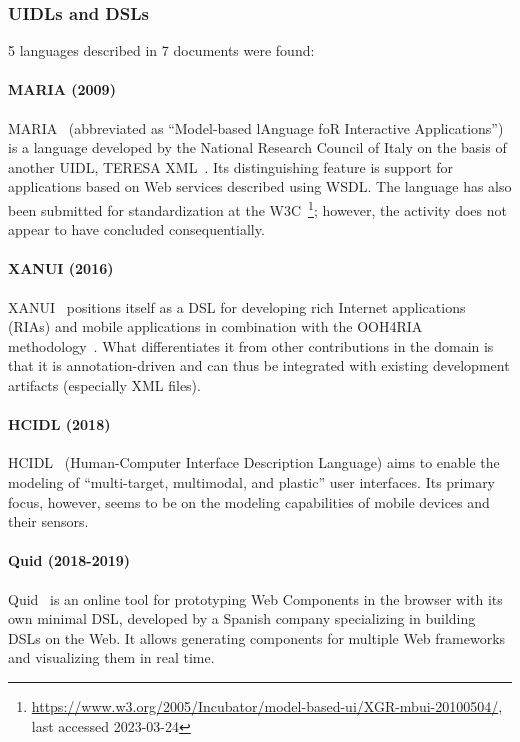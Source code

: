 \subsubsection{UIDLs and DSLs}
5 languages described in 7 documents were found:

\paragraph{MARIA (2009)}
MARIA~\cite{Paterno2009, MariaPDF} (abbreviated as \enquote{Model-based lAnguage foR Interactive Applications}) is a language developed by the National Research Council of Italy on the basis of another UIDL, TERESA XML~\cite{mori2004}.
Its distinguishing feature is support for applications based on Web services described using WSDL\@.
The language has also been submitted for standardization at the W3C~\footnote{\url{https://www.w3.org/2005/Incubator/model-based-ui/XGR-mbui-20100504/}, last accessed 2023-03-24};
however, the activity does not appear to have concluded consequentially.

\paragraph{XANUI (2016)}
XANUI~\cite{hermida2016xanui} positions itself as a DSL for developing rich Internet applications (RIAs) and mobile applications in combination with the OOH4RIA methodology~\cite{Meli2008}.
What differentiates it from other contributions in the domain is that it is annotation-driven and can thus be integrated with existing development artifacts (especially XML files).

\paragraph{HCIDL (2018)}
HCIDL~\cite{Gaouar2018} (Human-Computer Interface Description Language) aims to enable the modeling of \enquote{multi-target, multimodal, and plastic} user interfaces.
Its primary focus, however, seems to be on the modeling capabilities of mobile devices and their sensors.

\paragraph{Quid (2018-2019)}
Quid~\cite{molina2018quid, Molina2019} is an online tool for prototyping Web Components in the browser with its own minimal DSL, developed by a Spanish company specializing in building DSLs on the Web.
It allows generating components for multiple Web frameworks and visualizing them in real time.

